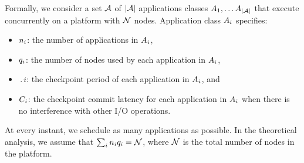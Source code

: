 Formally, we consider a set ${\mathcal A}$ of $|{\mathcal A}|$ applications classes
$A_{1}, \ldots A_{|{\mathcal A}|}$ that execute concurrently on a platform with
${\mathcal N}$ nodes. Application class $A_{i}$ specifies:
%
\begin{itemize}
\item $n_{i}$: the number of applications in $A_{i}$,
\item $q_{i}$: the number of nodes used by each application in $A_{i}$,
\item $\period{i}$: the checkpoint period of each application in $A_{i}$, and
\item $C_{i}$: the checkpoint commit latency for each application in $A_{i}$
  when there is no interference with other I/O operations.
\end{itemize}
%
%
At every instant, we schedule as many applications as possible.
In the theoretical analysis, we assume that
$\sum_{i}n_{i} q_{i} = {\mathcal N}$, where ${\mathcal N}$ is the total
number of nodes in the platform.



